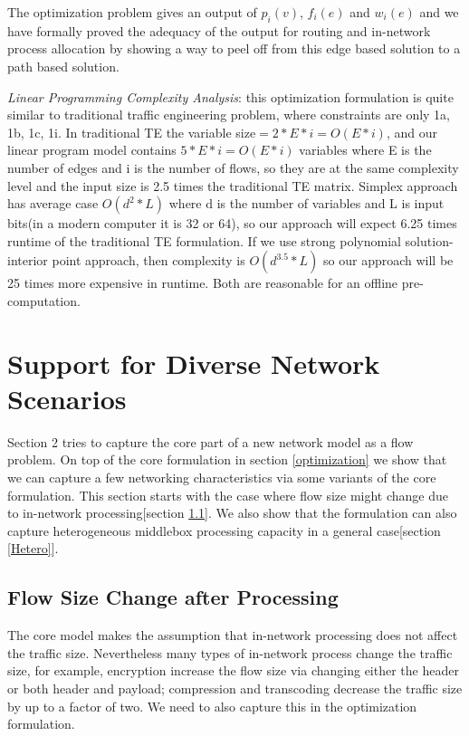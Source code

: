 \documentclass[twocolumn]{article}
\begin{document}
The optimization problem gives an output of $p_i(v)$, $f_i(e)$ and $w_i(e)$ and we have formally proved the adequacy of the output for routing and in-network process allocation by showing a way to peel off from this edge based solution to a path based solution. 


\emph{Linear Programming Complexity Analysis}: this optimization formulation is quite similar to traditional traffic engineering problem, where constraints are only 1a, 1b, 1c, 1i. In traditional TE the variable size$=2*E*i=O(E*i)$, and our linear program model contains $5*E*i=O(E*i)$ variables where E is the number of edges and i is the number of flows, so they are at the same complexity level and the input size is 2.5 times the traditional TE matrix. Simplex approach has average case $O(d^2*L)$ where d is the number of variables and L is input bits(in a modern computer it is 32 or 64), so our approach will expect 6.25 times runtime of the traditional TE formulation. If we use strong polynomial solution-interior point approach, then complexity is $O(d^{3.5}*L)$ \cite{InteriorPoint} so our approach will be 25 times more expensive in runtime. Both are reasonable for an offline pre-computation.

\section{Support for Diverse Network Scenarios}
Section 2 tries to capture the core part of a new network model as a flow problem. On top of the core formulation in section \ref{optimization} we show that we can capture a few networking characteristics via some variants of the core formulation. This section starts with the case where flow size might change due to in-network processing[section \ref{size change}]. We also show that the formulation can also capture heterogeneous middlebox processing capacity in a general case[section \ref{Hetero}].


\subsection{Flow Size Change after Processing}\label{size change}
The core model makes the assumption that in-network processing does not affect the traffic size. Nevertheless many types of in-network process change the traffic size, for example, encryption increase the flow size via changing either the header or both header and payload\cite{SIMPLE2013}; compression and transcoding decrease the traffic size by up to a factor of two\cite{Mogul1997}. We need to also capture this in the optimization formulation.
\end{document}
